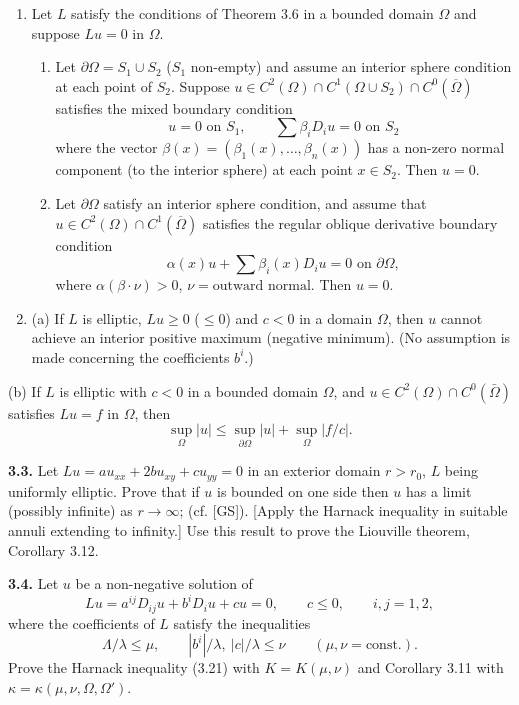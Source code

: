\begin{enumerate}
\item[3.1.] Let $L$ satisfy the conditions of Theorem 3.6 in a bounded domain $\Omega$ and suppose $Lu=0$ in $\Omega$.
\begin{enumerate}
\item[(a)] Let $\partial\Omega = S_1 \cup S_2$ ($S_1$ non-empty) and assume an interior sphere condition at each point of $S_2$. Suppose $u \in C^2(\Omega) \cap C^1(\Omega \cup S_2) \cap C^0(\overline{\Omega})$ satisfies the mixed boundary condition
\[
u = 0 \text{ on } S_1, \qquad \sum \beta_i D_i u = 0 \text{ on } S_2
\]
where the vector $\beta(x) = (\beta_1(x), \ldots, \beta_n(x))$ has a non-zero normal component (to the interior sphere) at each point $x \in S_2$. Then $u = 0$.
\item[(b)] Let $\partial\Omega$ satisfy an interior sphere condition, and assume that $u \in C^2(\Omega) \cap C^1(\overline{\Omega})$ satisfies the regular oblique derivative boundary condition
\[
\alpha(x)u + \sum \beta_i(x)D_i u = 0 \text{ on } \partial\Omega,
\]
where $\alpha(\beta \cdot \nu) > 0$, $\nu = \text{outward normal}$. Then $u = 0$.
\end{enumerate}
\item[3.2.] (a) If $L$ is elliptic, $Lu \ge 0$ ($\le 0$) and $c < 0$ in a domain $\Omega$, then $u$ cannot achieve an interior positive maximum (negative minimum). (No assumption is made concerning the coefficients $b^i$.)
\end{enumerate}


(b) If $L$ is elliptic with $c<0$ in a bounded domain $\Omega$, and $u\in C^2(\Omega)\cap C^0(\bar\Omega)$ satisfies $Lu=f$ in $\Omega$, then
\[
\sup_{\Omega}|u|\leq \sup_{\partial\Omega}|u|+\sup_{\Omega}|f/c|.
\]

\textbf{3.3.} Let $Lu=a u_{xx}+2b u_{xy}+c u_{yy}=0$ in an exterior domain $r>r_0$, $L$ being uniformly elliptic. Prove that if $u$ is bounded on one side then $u$ has a limit (possibly infinite) as $r\to\infty$; (cf. [GS]). [Apply the Harnack inequality in suitable annuli extending to infinity.] Use this result to prove the Liouville theorem, Corollary 3.12.

\textbf{3.4.} Let $u$ be a non-negative solution of
\[
Lu=a^{ij}D_{ij}u+b^iD_iu+cu=0,\qquad c\leq 0,\qquad i,j=1,2,
\]
where the coefficients of $L$ satisfy the inequalities
\[
\Lambda/\lambda\leq\mu,\qquad |b^i|/\lambda,\ |c|/\lambda\leq \nu\qquad (\mu,\nu=\text{const.}).
\]
Prove the Harnack inequality (3.21) with $K=K(\mu,\nu)$ and Corollary 3.11 with $\kappa=\kappa(\mu,\nu,\Omega,\Omega')$.

